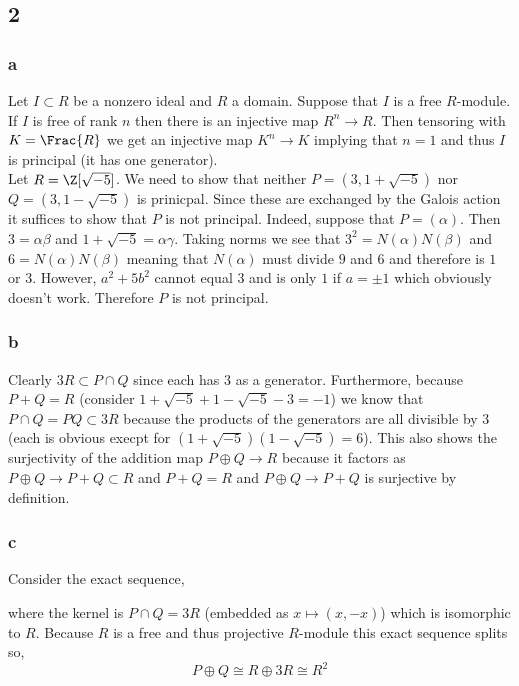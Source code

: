 \documentclass[12pt]{article}
\begin{document}
\subsection{2}

\subsubsection{a}

Let $I \subset R$ be a nonzero ideal and $R$ a domain. Suppose that $I$ is a free $R$-module. If $I$ is free of rank $n$ then there is an injective map $R^n \to R$. Then tensoring with $K = \Frac{R}$ we get an injective map $K^n \to K$ implying that $n = 1$ and thus $I$ is principal (it has one generator).
\bigskip\\
Let $R = \Z[\sqrt{-5}]$. We need to show that neither $P = (3, 1 + \sqrt{-5})$ nor $Q = (3, 1-\sqrt{-5})$ is prinicpal. Since these are exchanged by the Galois action it suffices to show that $P$ is not principal. Indeed, suppose that $P = (\alpha)$. Then $3 = \alpha \beta$ and $1 + \sqrt{-5} = \alpha \gamma$. Taking norms we see that $3^2 = N(\alpha) N(\beta)$ and $6 = N(\alpha) N(\beta)$ meaning that $N(\alpha)$ must divide $9$ and $6$ and therefore is $1$ or $3$. However, $a^2 + 5 b^2$ cannot equal $3$ and is only $1$ if $a = \pm 1$ which obviously doesn't work. Therefore $P$ is not principal.

\subsubsection{b}

Clearly $3 R \subset P \cap Q$ since each has $3$ as a generator. Furthermore, because $P + Q = R$ (consider $1 + \sqrt{-5} + 1 - \sqrt{-5} - 3 = -1$) we know that $P \cap Q = PQ \subset 3 R$ because the products of the generators are all divisible by $3$ (each is obvious execpt for $(1 + \sqrt{-5})(1 - \sqrt{-5}) = 6$). This also shows the surjectivity of the addition map $P \oplus Q \to R$ because it factors as $P \oplus Q \to P + Q \subset R$ and $P + Q = R$ and $P \oplus Q \to P + Q$ is surjective by definition.

\subsubsection{c}

Consider the exact sequence,
\begin{center}
\end{center}
where the kernel is $P \cap Q = 3 R$ (embedded as $x \mapsto (x, -x)$) which is isomorphic to $R$. Because $R$ is a free and thus projective $R$-module this exact sequence splits so,
\[ P \oplus Q \cong R \oplus 3 R \cong R^2 \]
\end{document}
